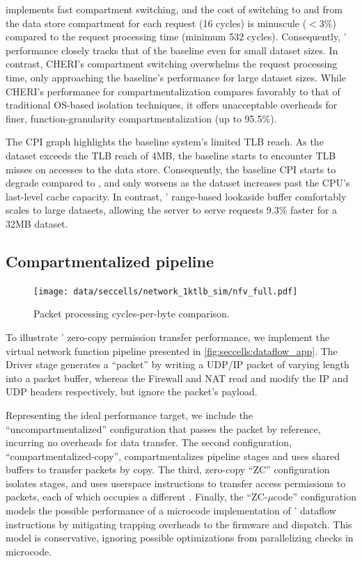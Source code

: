 \seccells implements fast compartment switching, and 
the cost of switching to and from the data store compartment
for each request (16 cycles) is minuscule ($< 3\%$) compared to the
request processing time (minimum 532 cycles).
Consequently, \seccells' performance closely tracks that of 
the baseline even for small dataset sizes.
In contrast, CHERI's compartment switching overwhelms the
request processing time, only approaching the baseline's
performance for large dataset sizes.
While CHERI's performance for compartmentalization compares
favorably to that of traditional OS-based isolation 
techniques, it offers unacceptable overheads for finer, 
function-granularity compartmentalization (up to 95.5\%).

The CPI graph highlights the baseline system's limited TLB 
reach.
As the dataset exceeds the TLB reach of 4MB, the baseline starts
to encounter TLB misses on accesses to the data store.
Consequently, the baseline CPI starts to degrade compared to
\seccells, and only worsens as the dataset increases past the
CPU's last-level cache capacity.
In contrast, \seccells' range-based lookaside buffer comfortably
scales to large datasets, allowing the  server to
serve requests 9.3\% faster for a 32MB dataset.
 
\subsection{Compartmentalized pipeline}

\begin{figure}
  \centering
  \texttt{[image: data/seccells/network\_1ktlb\_sim/nfv\_full.pdf]}
  \caption[\seccells performance comparison: Network function]
          {Packet processing cycles-per-byte comparison.}
  \label{fig:seccells:nfv_cpb}
\end{figure}

To illustrate \seccells' zero-copy permission transfer performance,
we implement the virtual network function pipeline presented in
\autoref{fig:seccells:dataflow_app}.
The Driver stage generates a ``packet'' by writing a UDP/IP packet
of varying length into a packet buffer, whereas 
the Firewall and NAT read and modify the IP and UDP headers
respectively, but ignore the packet's payload.

Representing the ideal performance target,  we include the
``uncompartmentalized'' configuration that passes the packet by 
reference, incurring no overheads for data transfer.
The second configuration, ``compartmentalized-copy'', 
compartmentalizes pipeline stages and uses shared buffers to transfer
packets by copy.
The third, zero-copy ``\seccells ZC''  configuration isolates
stages, and uses userspace instructions to transfer 
access permissions to packets, each of which occupies a
different \cell{}.
Finally, the ``\seccells ZC-$\mu$code'' configuration models the 
possible performance of a microcode implementation of \seccells' 
dataflow instructions by mitigating trapping overheads
to the firmware and dispatch.
This model is conservative, ignoring possible optimizations from
parallelizing checks in microcode.

